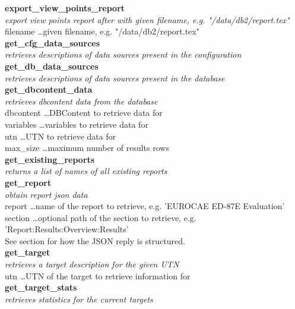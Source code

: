 \textbf{export\_view\_points\_report} \\
\textit{export view points report after with given filename, e.g. "/data/db2/report.tex"} \\
filename \dots given filename, e.g. "/data/db2/report.tex" \\

\textbf{get\_cfg\_data\_sources} \\
\textit{retrieves descriptions of data sources present in the configuration} \\

\textbf{get\_db\_data\_sources} \\
\textit{retrieves descriptions of data sources present in the database} \\

\textbf{get\_dbcontent\_data} \\
\textit{retrieves dbcontent data from the database} \\
dbcontent \dots DBContent to retrieve data for \\
variables \dots variables to retrieve data for \\
utn \dots UTN to retrieve data for \\
max\_size \dots maximum number of results rows \\

\textbf{get\_existing\_reports} \\
\textit{returns a list of names of all existing reports} \\

\textbf{get\_report} \\
\textit{obtain report json data} \\
report \dots name of the report to retrieve, e.g. 'EUROCAE ED-87E Evaluation' \\
section \dots optional path of the section to retrieve, e.g. 'Report:Results:Overview:Results' \\
See section  for how the JSON reply is structured. \\

\textbf{get\_target} \\
\textit{retrieves a target description for the given UTN} \\
utn \dots UTN of the target to retrieve information for \\

\textbf{get\_target\_stats} \\
\textit{retrieves statistics for the current targets} \\

